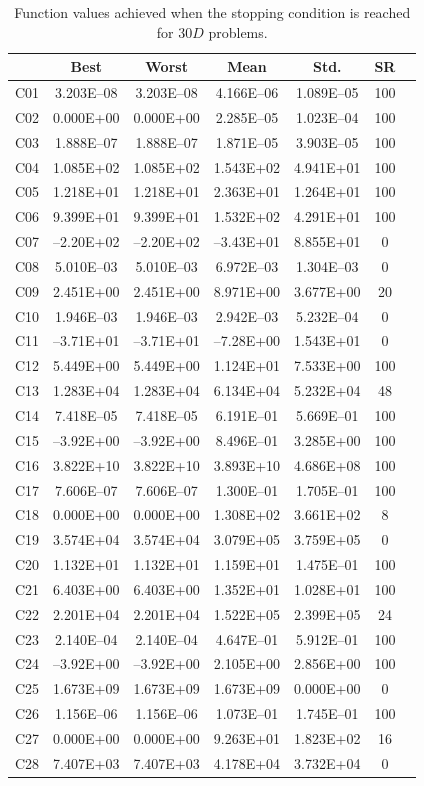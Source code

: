 \documentclass[conference]{IEEEtran}
\begin{document}
% 
% 
% 
\begin{table}[!ht]
	\caption{Function values achieved when the stopping condition is reached for $30D$ problems.}
	\centering
	\begin{tabular}{|c|c|c|c|c|c|c|}
	\hline
     & Best & Worst & Mean & Std. & SR \\ \hline \hline
C01 &3.203E--08 &3.203E--08 &4.166E--06 &1.089E--05 & 100 \\
C02 & 0.000E+00 & 0.000E+00 &2.285E--05 &1.023E--04 & 100 \\
C03 &1.888E--07 &1.888E--07 &1.871E--05 &3.903E--05 & 100 \\
C04 & 1.085E+02 & 1.085E+02 & 1.543E+02 & 4.941E+01 & 100 \\
C05 & 1.218E+01 & 1.218E+01 & 2.363E+01 & 1.264E+01 & 100 \\
C06 & 9.399E+01 & 9.399E+01 & 1.532E+02 & 4.291E+01 & 100 \\
C07 &--2.20E+02 &--2.20E+02 &--3.43E+01 & 8.855E+01 & 0 \\
C08 &5.010E--03 &5.010E--03 &6.972E--03 &1.304E--03 & 0 \\
C09 & 2.451E+00 & 2.451E+00 & 8.971E+00 & 3.677E+00 & 20 \\
C10 &1.946E--03 &1.946E--03 &2.942E--03 &5.232E--04 & 0 \\
C11 &--3.71E+01 &--3.71E+01 &--7.28E+00 & 1.543E+01 & 0 \\
C12 & 5.449E+00 & 5.449E+00 & 1.124E+01 & 7.533E+00 & 100 \\
C13 & 1.283E+04 & 1.283E+04 & 6.134E+04 & 5.232E+04 & 48 \\
C14 &7.418E--05 &7.418E--05 &6.191E--01 &5.669E--01 & 100 \\
C15 &--3.92E+00 &--3.92E+00 &8.496E--01 & 3.285E+00 & 100 \\
C16 & 3.822E+10 & 3.822E+10 & 3.893E+10 & 4.686E+08 & 100 \\
C17 &7.606E--07 &7.606E--07 &1.300E--01 &1.705E--01 & 100 \\
C18 & 0.000E+00 & 0.000E+00 & 1.308E+02 & 3.661E+02 & 8 \\
C19 & 3.574E+04 & 3.574E+04 & 3.079E+05 & 3.759E+05 & 0 \\
C20 & 1.132E+01 & 1.132E+01 & 1.159E+01 &1.475E--01 & 100 \\
C21 & 6.403E+00 & 6.403E+00 & 1.352E+01 & 1.028E+01 & 100 \\
C22 & 2.201E+04 & 2.201E+04 & 1.522E+05 & 2.399E+05 & 24 \\
C23 &2.140E--04 &2.140E--04 &4.647E--01 &5.912E--01 & 100 \\
C24 &--3.92E+00 &--3.92E+00 & 2.105E+00 & 2.856E+00 & 100 \\
C25 & 1.673E+09 & 1.673E+09 & 1.673E+09 & 0.000E+00 & 0 \\
C26 &1.156E--06 &1.156E--06 &1.073E--01 &1.745E--01 & 100 \\
C27 & 0.000E+00 & 0.000E+00 & 9.263E+01 & 1.823E+02 & 16 \\
C28 & 7.407E+03 & 7.407E+03 & 4.178E+04 & 3.732E+04 & 0 \\
\hline
	\end{tabular}
	\label{tab:d30}
\end{table}
\end{document}

